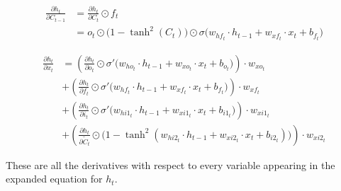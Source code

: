 \documentclass[12pt]{article}
\begin{document}
\begin{align*}
\frac{\partial h_t}{\partial C_{t-1}} &= \frac{\partial h_t}{\partial C_t} \odot f_t \\
&= o_t \odot \bigl(1 - \tanh^2(C_t)\bigr) \odot \sigma\bigl(w_{hf_t} \cdot h_{t-1} + w_{xf_t} \cdot x_t + b_{f_t}\bigr)
\end{align*}

\begin{align*}
\frac{\partial h_t}{\partial x_t} &=
\left( \frac{\partial h_t}{\partial o_t} \odot \sigma'\bigl(w_{ho_t} \cdot h_{t-1} + w_{xo_t} \cdot x_t + b_{o_t}\bigr) \right) \cdot w_{xo_t} \nonumber \\
&+ \left( \frac{\partial h_t}{\partial f_t} \odot \sigma'\bigl(w_{hf_t} \cdot h_{t-1} + w_{xf_t} \cdot x_t + b_{f_t}\bigr) \right) \cdot w_{xf_t} \nonumber \\
&+ \left( \frac{\partial h_t}{\partial i_t} \odot \sigma'\bigl(w_{hi1_t} \cdot h_{t-1} + w_{xi1_t} \cdot x_t + b_{i1_t}\bigr) \right) \cdot w_{xi1_t} \nonumber \\
&+ \left( \frac{\partial h_t}{\partial \tilde{C}_t} \odot \bigl(1 - \tanh^2(w_{hi2_t} \cdot h_{t-1} + w_{xi2_t} \cdot x_t + b_{i2_t})\bigr) \right) \cdot w_{xi2_t}
\end{align*}

These are all the derivatives with respect to every variable appearing in the expanded equation for $h_t$.
\end{document}
